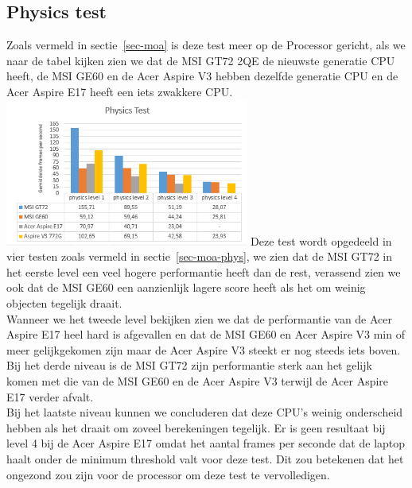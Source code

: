 \subsection{Physics test}
Zoals vermeld in sectie~\ref{sec-moa} is deze test meer op de Processor gericht, als we naar de tabel kijken zien we dat de MSI GT72 2QE de nieuwste generatie CPU heeft, de MSI GE60 en de Acer Aspire V3 hebben dezelfde generatie CPU en de Acer Aspire E17 heeft een iets zwakkere CPU.\\
\includegraphics[width=8cm]{physics}
\vskip 0.1cm
\noindent
Deze test wordt opgedeeld in vier testen zoals vermeld in sectie~\ref{sec-moa-phys}, we zien dat de MSI GT72 in het eerste level een veel hogere performantie heeft dan de rest, verassend zien we ook dat de MSI GE60 een aanzienlijk lagere score heeft als het om weinig objecten tegelijk draait.\\
Wanneer we het tweede level bekijken zien we dat de performantie van de Acer Aspire E17 heel hard is afgevallen en dat de MSI GE60 en Acer Aspire V3 min of meer gelijkgekomen zijn maar de Acer Aspire V3 steekt er nog steeds iets boven.\\
Bij het derde niveau is de MSI GT72 zijn performantie sterk aan het gelijk komen met die van de MSI GE60 en de Acer Aspire V3 terwijl de Acer Aspire E17 verder afvalt.\\
Bij het laatste niveau kunnen we concluderen dat deze CPU's weinig onderscheid hebben als het draait om zoveel berekeningen tegelijk. Er is geen resultaat bij level 4 bij de Acer Aspire E17 omdat het aantal frames per seconde dat de laptop haalt onder de minimum threshold valt voor deze test. Dit zou betekenen dat het ongezond zou zijn voor de processor om deze test te vervolledigen. \citep{3dmark_tech}

